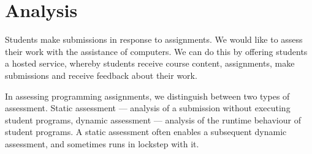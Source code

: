 
\chapter{Analysis}

Students make submissions in response to assignments. We would like to assess
their work with the assistance of computers. We can do this by offering
students a hosted service, whereby students receive course content,
assignments, make submissions and receive feedback about their work.

In assessing programming assignments, we distinguish between two types of
assessment. Static assessment --- analysis of a submission without executing
student programs, dynamic assessment --- analysis of the runtime behaviour of
student programs. A static assessment often enables a subsequent dynamic
assessment, and sometimes runs in lockstep with it.













